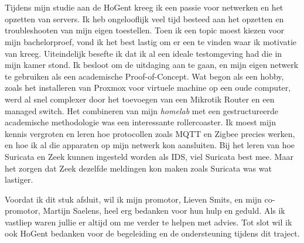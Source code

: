 
\chapter*{}%
\label{ch:voorwoord}


Tijdens mijn studie aan de HoGent kreeg ik een passie voor netwerken en het opzetten van servers. Ik heb ongelooflijk veel tijd besteed aan het opzetten en troubleshooten van mijn eigen toestellen. Toen ik een topic moest kiezen voor mijn bachelorproef, vond ik het best lastig om er een te vinden waar ik motivatie van kreeg. Uiteindelijk besefte ik dat ik al een ideale testomgeving had die in mijn kamer stond.
Ik besloot om de uitdaging aan te gaan, en mijn eigen netwerk te gebruiken als een academische Proof-of-Concept. Wat begon als een hobby, zoals het installeren van Proxmox voor virtuele machine op een oude computer, werd al snel complexer door het toevoegen van een Mikrotik Router en een managed switch.
Het combineren van mijn \textit{homelab} met een gestructureerde academische methodologie was een interessante rollercoaster. Ik moest mijn kennis vergroten en leren hoe protocollen zoals MQTT en Zigbee precies werken, en hoe ik al die apparaten op mijn netwerk kon aansluiten. Bij het leren van hoe Suricata en Zeek kunnen ingesteld worden als IDS, viel Suricata best mee. Maar het zorgen dat Zeek dezelfde meldingen kon maken zoals Suricata was wat lastiger.

Voordat ik dit stuk afsluit, wil ik mijn promotor, Lieven Smits, en mijn co-promotor, Martijn Saelens, heel erg bedanken voor hun hulp en geduld. Als ik vastliep waren jullie er altijd om me verder te helpen met advies. Tot slot wil ik ook HoGent bedanken voor de begeleiding en de ondersteuning tijdens dit traject.
